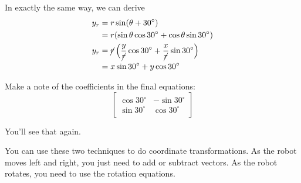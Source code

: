 \documentclass{article}
\begin{document}
In exactly the same way, we can derive
\begin{align*}
    y_r &= r\sin(\theta+30^\circ)\\
        &= r(\sin\theta\cos 30^\circ + \cos\theta\sin 30^\circ)\\
    y_r &= {\cancel r}\left(\frac y{\cancel r}\cos 30^\circ + \frac x{\cancel r}\sin 30^\circ\right)\\
        &= x\sin 30^\circ + y\cos 30^\circ 
\end{align*}

Make a note of the coefficients in the final equations:
\[
    \begin{bmatrix}
        \cos 30^\circ & -\sin 30^\circ\\
        \sin 30^\circ & \cos 30^\circ
    \end{bmatrix}
\]

You'll see that again.

You can use these two techniques to do coordinate transformations. 
As the robot moves left and right, you just need to add or subtract vectors.
As the robot rotates, you need to use the rotation equations.
\end{document}
